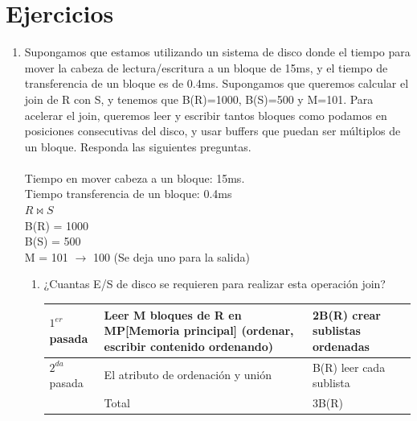 \documentclass{templateNote}
\begin{document}


\portada
\margenes 
\tableofcontents
\newpage


\section{Ejercicios}

\begin{enumerate}
    \item Supongamos que estamos utilizando un sistema de disco donde el tiempo para mover la cabeza de lectura/escritura a un bloque de 15ms, y el tiempo de transferencia de un bloque es de 0.4ms. Supongamos que queremos calcular el join de R con S, y tenemos que B(R)=1000, B(S)=500 y M=101. Para acelerar el join, queremos leer y escribir tantos bloques como podamos en posiciones consecutivas del disco, y usar buffers que puedan ser múltiplos de un bloque. Responda las siguientes preguntas. \\\\
    Tiempo en mover cabeza a un bloque: 15ms.\\
    Tiempo transferencia de un bloque: 0.4ms \\
    \underline{$R \Join S$}\\
    \hspace*{0.25cm} B(R) = 1000 \\
    \hspace*{0.25cm} B(S) = 500 \\
    \hspace*{0.25cm} M = 101 $\rightarrow$ 100 (Se deja uno para la salida)\\
    \begin{enumerate}[label=\alph*)]
        \item ¿Cuantas E/S de disco se requieren para realizar esta operación join? \\

        \begin{tabular}{|m{2cm}|m{6cm}|m{4cm}|}
            \hline
            $1^{er}$ pasada & Leer M bloques de R en MP[Memoria principal] (ordenar, escribir contenido ordenando) & 2B(R) crear sublistas ordenadas \\
            \hline
            $2^{da}$ pasada & El atributo de ordenación y unión & B(R) leer cada sublista \\
            \hline
            & Total & 3B(R) \\
            \hline
        \end{tabular}
        

\end{enumerate}
\end{enumerate}
\end{document}
